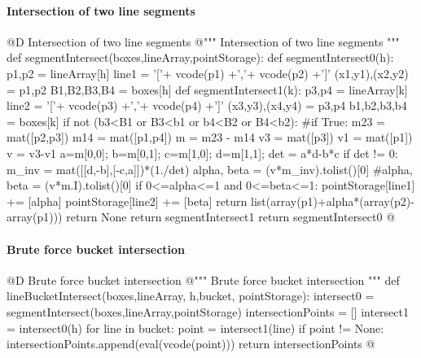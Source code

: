\documentclass[11pt,oneside]{article}    %
\begin{document}
\paragraph{Intersection of two line segments}
@D Intersection of two line segments
@{""" Intersection of two line segments """
def segmentIntersect(boxes,lineArray,pointStorage):
    def segmentIntersect0(h):
        p1,p2 = lineArray[h]
        line1 = '['+ vcode(p1) +','+ vcode(p2) +']'
        (x1,y1),(x2,y2) = p1,p2
        B1,B2,B3,B4 = boxes[h]
        def segmentIntersect1(k):
            p3,p4 = lineArray[k]
            line2 = '['+ vcode(p3) +','+ vcode(p4) +']'
            (x3,y3),(x4,y4) = p3,p4
            b1,b2,b3,b4 = boxes[k]
            if not (b3<B1 or B3<b1 or b4<B2 or B4<b2):
            #if True:
                m23 = mat([p2,p3])
                m14 = mat([p1,p4])
                m = m23 - m14
                v3 = mat([p3])
                v1 = mat([p1])
                v = v3-v1
                a=m[0,0]; b=m[0,1]; c=m[1,0]; d=m[1,1];
                det = a*d-b*c
                if det != 0:
                    m_inv = mat([[d,-b],[-c,a]])*(1./det)
                    alpha, beta = (v*m_inv).tolist()[0]
                    #alpha, beta = (v*m.I).tolist()[0]
                    if 0<=alpha<=1 and 0<=beta<=1:
                        pointStorage[line1] += [alpha]
                        pointStorage[line2] += [beta]
                        return list(array(p1)+alpha*(array(p2)-array(p1)))
            return None
        return segmentIntersect1
    return segmentIntersect0
@}


\paragraph{Brute force bucket intersection}
@D Brute force bucket intersection
@{""" Brute force bucket intersection """
def lineBucketIntersect(boxes,lineArray, h,bucket, pointStorage):
    intersect0 = segmentIntersect(boxes,lineArray,pointStorage)
    intersectionPoints = []
    intersect1 = intersect0(h)
    for line in bucket:
        point = intersect1(line)
        if point != None: 
            intersectionPoints.append(eval(vcode(point)))
    return intersectionPoints
@}
\end{document}
